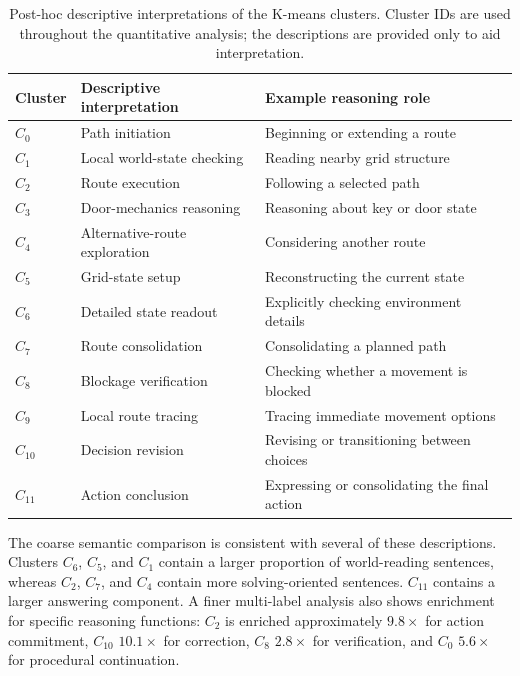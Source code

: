\documentclass{article}
\begin{document}
\begin{table}[htbp]
\centering
\small
\begin{tabular}{lll}
\toprule
Cluster & Descriptive interpretation & Example reasoning role \\
\midrule
\(C_0\)  & Path initiation & Beginning or extending a route \\
\(C_1\)  & Local world-state checking & Reading nearby grid structure \\
\(C_2\)  & Route execution & Following a selected path \\
\(C_3\)  & Door-mechanics reasoning & Reasoning about key or door state \\
\(C_4\)  & Alternative-route exploration & Considering another route \\
\(C_5\)  & Grid-state setup & Reconstructing the current state \\
\(C_6\)  & Detailed state readout & Explicitly checking environment details \\
\(C_7\)  & Route consolidation & Consolidating a planned path \\
\(C_8\)  & Blockage verification & Checking whether a movement is blocked \\
\(C_9\)  & Local route tracing & Tracing immediate movement options \\
\(C_{10}\) & Decision revision & Revising or transitioning between choices \\
\(C_{11}\) & Action conclusion & Expressing or consolidating the final action \\
\bottomrule
\end{tabular}
\caption{Post-hoc descriptive interpretations of the K-means clusters.
Cluster IDs are used throughout the quantitative analysis; the descriptions
are provided only to aid interpretation.}
\label{tab:cluster-labels}
\end{table}


The coarse semantic comparison is consistent with several of these
descriptions. Clusters \(C_6\), \(C_5\), and \(C_1\) contain a larger
proportion of world-reading sentences, whereas \(C_2\), \(C_7\), and \(C_4\)
contain more solving-oriented sentences. \(C_{11}\) contains a larger
answering component. A finer multi-label analysis also shows enrichment for
specific reasoning functions: \(C_2\) is enriched approximately
\(9.8\times\) for action commitment, \(C_{10}\) \(10.1\times\) for
correction, \(C_8\) \(2.8\times\) for verification, and \(C_0\)
\(5.6\times\) for procedural continuation.
\end{document}
